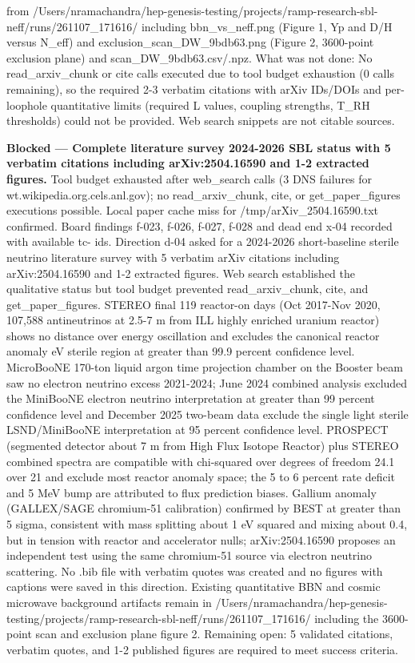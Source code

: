 \documentclass[11pt,a4paper]{article}
\begin{document}
from /Users/nramachandra/hep-genesis-testing/projects/ramp-research-sbl-neff/runs/261107\_171616/ including bbn\_vs\_neff.png (Figure 1, Yp and D/H versus N\_eff) and exclusion\_scan\_DW\_9bdb63.png (Figure 2, 3600-point exclusion plane) and scan\_DW\_9bdb63.csv/.npz. What was not done: No read\_arxiv\_chunk or cite calls executed due to tool budget exhaustion (0 calls remaining), so the required 2-3 verbatim citations with arXiv IDs/DOIs and per-loophole quantitative limits (required L values, coupling strengths, T\_RH thresholds) could not be provided. Web search snippets are not citable sources.

\textbf{Blocked --- Complete literature survey 2024-2026 SBL status with 5 verbatim citations including arXiv:2504.16590 and 1-2 extracted figures.} Tool budget exhausted after web\_search calls (3 DNS failures for wt.wikipedia.org.cels.anl.gov); no read\_arxiv\_chunk, cite, or get\_paper\_figures executions possible. Local paper cache miss for /tmp/arXiv\_2504.16590.txt confirmed. Board findings f-023, f-026, f-027, f-028 and dead end x-04 recorded with available tc- ids. Direction d-04 asked for a 2024-2026 short-baseline sterile neutrino literature survey with 5 verbatim arXiv citations including arXiv:2504.16590 and 1-2 extracted figures. Web search established the qualitative status but tool budget prevented read\_arxiv\_chunk, cite, and get\_paper\_figures. STEREO final 119 reactor-on days (Oct 2017-Nov 2020, 107,588 antineutrinos at 2.5-7 m from ILL highly enriched uranium reactor) shows no distance over energy oscillation and excludes the canonical reactor anomaly eV sterile region at greater than 99.9 percent confidence level. MicroBooNE 170-ton liquid argon time projection chamber on the Booster beam saw no electron neutrino excess 2021-2024; June 2024 combined analysis excluded the MiniBooNE electron neutrino interpretation at greater than 99 percent confidence level and December 2025 two-beam data exclude the single light sterile LSND/MiniBooNE interpretation at 95 percent confidence level. PROSPECT (segmented detector about 7 m from High Flux Isotope Reactor) plus STEREO combined spectra are compatible with chi-squared over degrees of freedom 24.1 over 21 and exclude most reactor anomaly space; the 5 to 6 percent rate deficit and 5 MeV bump are attributed to flux prediction biases. Gallium anomaly (GALLEX/SAGE chromium-51 calibration) confirmed by BEST at greater than 5 sigma, consistent with mass splitting about 1 eV squared and mixing about 0.4, but in tension with reactor and accelerator nulls; arXiv:2504.16590 proposes an independent test using the same chromium-51 source via electron neutrino scattering. No .bib file with verbatim quotes was created and no figures with captions were saved in this direction. Existing quantitative BBN and cosmic microwave background artifacts remain in /Users/nramachandra/hep-genesis-testing/projects/ramp-research-sbl-neff/runs/261107\_171616/ including the 3600-point scan and exclusion plane figure 2. Remaining open: 5 validated citations, verbatim quotes, and 1-2 published figures are required to meet success criteria.
\end{document}
